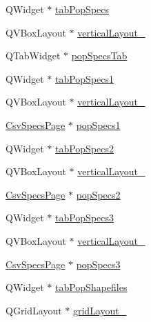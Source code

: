 \begin{DoxyCompactItemize}
\item 
Q\+Widget $\ast$ \mbox{\hyperlink{class_ui___vessel_editor_main_window_a313f3bd060bbe43fc7841511743e0038}{tab\+Pop\+Specs}}
\item 
Q\+V\+Box\+Layout $\ast$ \mbox{\hyperlink{class_ui___vessel_editor_main_window_ab20f7bce7d844dacd264fd086e25fe2e}{vertical\+Layout\+\_}}
\item 
Q\+Tab\+Widget $\ast$ \mbox{\hyperlink{class_ui___vessel_editor_main_window_a3ecfb343f4ddc7c4200b1a8397b0cc94}{pop\+Specs\+Tab}}
\item 
Q\+Widget $\ast$ \mbox{\hyperlink{class_ui___vessel_editor_main_window_ae6c9d16b0a0c5b21a586679b61e30b04}{tab\+Pop\+Specs1}}
\item 
Q\+V\+Box\+Layout $\ast$ \mbox{\hyperlink{class_ui___vessel_editor_main_window_a03afe0a2218fc647b29b639d661537a7}{vertical\+Layout\+\_}}
\item 
\mbox{\hyperlink{class_csv_specs_page}{Csv\+Specs\+Page}} $\ast$ \mbox{\hyperlink{class_ui___vessel_editor_main_window_ae01a40f59043c4456f63b40b8b93da36}{pop\+Specs1}}
\item 
Q\+Widget $\ast$ \mbox{\hyperlink{class_ui___vessel_editor_main_window_ad810367c7ea17a17756b4f9ba7db196e}{tab\+Pop\+Specs2}}
\item 
Q\+V\+Box\+Layout $\ast$ \mbox{\hyperlink{class_ui___vessel_editor_main_window_a57c471d795d0cda566bd4e6a2939f573}{vertical\+Layout\+\_}}
\item 
\mbox{\hyperlink{class_csv_specs_page}{Csv\+Specs\+Page}} $\ast$ \mbox{\hyperlink{class_ui___vessel_editor_main_window_a136dff78035429df73254eb32befab5c}{pop\+Specs2}}
\item 
Q\+Widget $\ast$ \mbox{\hyperlink{class_ui___vessel_editor_main_window_a52f17c9a83d07dc735429b7f1f65e7bf}{tab\+Pop\+Specs3}}
\item 
Q\+V\+Box\+Layout $\ast$ \mbox{\hyperlink{class_ui___vessel_editor_main_window_a799560972f97aaac0c01ca03c958deba}{vertical\+Layout\+\_}}
\item 
\mbox{\hyperlink{class_csv_specs_page}{Csv\+Specs\+Page}} $\ast$ \mbox{\hyperlink{class_ui___vessel_editor_main_window_ada156cd42cd6a8afbfdc90e65c2aaf51}{pop\+Specs3}}
\item 
Q\+Widget $\ast$ \mbox{\hyperlink{class_ui___vessel_editor_main_window_a011f65ef7db9680dcfbc1e57545d4235}{tab\+Pop\+Shapefiles}}
\item 
Q\+Grid\+Layout $\ast$ \mbox{\hyperlink{class_ui___vessel_editor_main_window_ac2c339b9676a568107e98ed72797b65e}{grid\+Layout\+\_}}

\end{DoxyCompactItemize}
